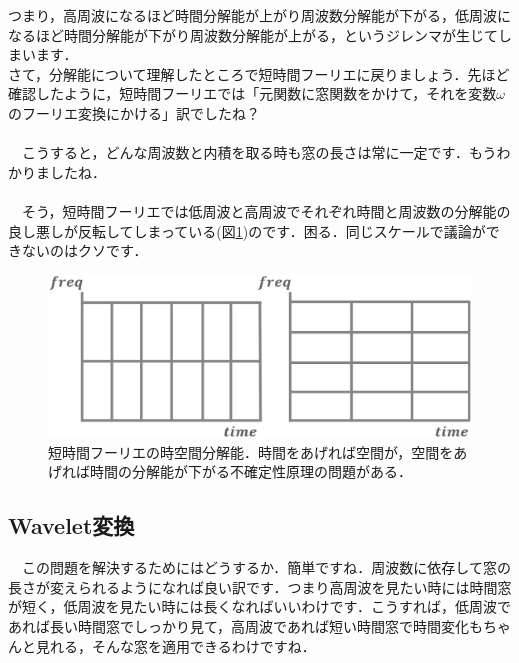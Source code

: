 \documentclass[11pt,a4paper]{ujreport} 	%
\begin{document}
つまり，高周波になるほど時間分解能が上がり周波数分解能が下がる，低周波になるほど時間分解能が下がり周波数分解能が上がる，というジレンマが生じてしまいます．\\

さて，分解能について理解したところで短時間フーリエに戻りましょう．先ほど確認したように，短時間フーリエでは「元関数に窓関数をかけて，それを変数$\omega$のフーリエ変換にかける」訳でしたね？\\
\\
　こうすると，どんな周波数と内積を取る時も窓の長さは常に一定です．もうわかりましたね．\\
\\
　そう，短時間フーリエでは低周波と高周波でそれぞれ時間と周波数の分解能の良し悪しが反転してしまっている(図\ref{im:furiers})のです．困る．同じスケールで議論ができないのはクソです．

\begin{figure}[H]
\label{im:furiers}
 \centering
 \includegraphics[width=15cm]{../figures/uncertainty.eps}
 \caption{短時間フーリエの時空間分解能．時間をあげれば空間が，空間をあげれば時間の分解能が下がる不確定性原理の問題がある．}
\end{figure}


\subsection{Wavelet変換}
　この問題を解決するためにはどうするか．簡単ですね．周波数に依存して窓の長さが変えられるようになれば良い訳です．つまり高周波を見たい時には時間窓が短く，低周波を見たい時には長くなればいいわけです．こうすれば，低周波であれば長い時間窓でしっかり見て，高周波であれば短い時間窓で時間変化もちゃんと見れる，そんな窓を適用できるわけですね．\\

\end{document}
